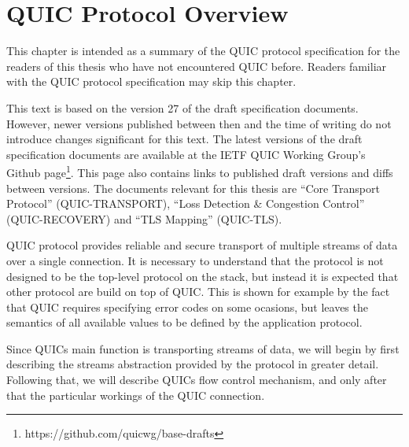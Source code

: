 \chapter{QUIC Protocol Overview}


This chapter is intended as a summary of the QUIC protocol specification for the readers of this
thesis who have not encountered QUIC before. Readers familiar with the QUIC protocol specification
may skip this chapter.

This text is based on the version 27 of the draft specification documents. However, newer versions
published between then and the time of writing do not introduce changes significant for this text.
The latest versions of the draft specification documents are available at the IETF QUIC Working
Group's Github page\footnote{https://github.com/quicwg/base-drafts}. This page also contains links
to published draft versions and diffs between versions. The documents relevant for this thesis are
``Core Transport Protocol'' (QUIC-TRANSPORT), ``Loss Detection \& Congestion Control''
(QUIC-RECOVERY) and ``TLS Mapping'' (QUIC-TLS).

QUIC protocol provides reliable and secure transport of multiple streams of data over a single
connection. It is necessary to understand that the protocol is not designed to be the top-level
protocol on the stack, but instead it is expected that other protocol are build on top of QUIC\@.
This is shown for example by the fact that QUIC requires specifying error codes on some ocasions,
but leaves the semantics of all available values to be defined by the application protocol.


Since QUICs main function is transporting streams of data, we will begin by first describing the
streams abstraction provided by the protocol in greater detail. Following that, we will describe
QUICs flow control mechanism, and only after that the particular workings of the QUIC connection.




